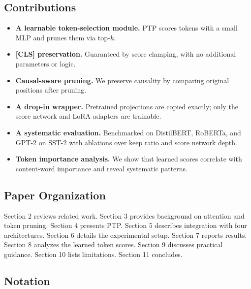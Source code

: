 \subsection{Contributions}

\begin{itemize}
\item \textbf{A learnable token-selection module.} PTP scores tokens with a small
  MLP and prunes them via top-$k$.
\item \textbf{[CLS] preservation.} Guaranteed by score clamping, with no additional
  parameters or logic.
\item \textbf{Causal-aware pruning.} We preserve causality by comparing original
  positions after pruning.
\item \textbf{A drop-in wrapper.} Pretrained projections are copied exactly; only
  the score network and LoRA adapters are trainable.
\item \textbf{A systematic evaluation.} Benchmarked on DistilBERT, RoBERTa, and
  GPT-2 on SST-2 with ablations over keep ratio and score network depth.
\item \textbf{Token importance analysis.} We show that learned scores correlate with
  content-word importance and reveal systematic patterns.

\end{itemize}
\subsection{Paper Organization}

Section 2 reviews related work. Section 3 provides background on attention 
and token pruning. Section 4 presents PTP. Section 5 describes integration 
with four architectures. Section 6 details the experimental setup. Section 
7 reports results. Section 8 analyzes the learned token scores. Section 9 
discusses practical guidance. Section 10 lists limitations. Section 11 
concludes.



\subsection{Notation}

